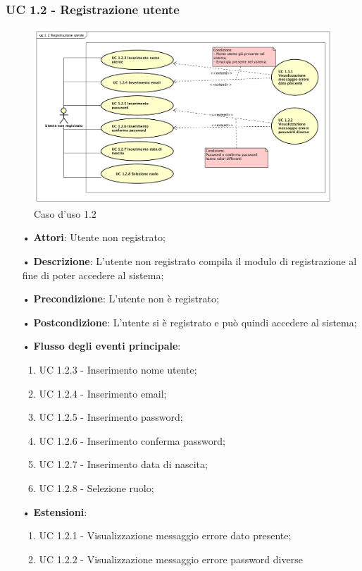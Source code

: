 \subsubsection{UC 1.2 - Registrazione utente}
\begin{figure}[H]
	\centering
	\includegraphics[width=17cm]{img/UC12.png} 
	\caption{Caso d'uso 1.2}\label{fig:12}
\end{figure}
\begin{itemize}
	\item[•]\textbf{Attori}: Utente non registrato;
	\item[•]\textbf{Descrizione}: L'utente non registrato compila il modulo di registrazione al fine di poter accedere al sistema;
	\item[•]\textbf{Precondizione}: L'utente non è registrato;
	\item[•]\textbf{Postcondizione}: L'utente si è registrato e può quindi accedere al sistema;
	\item[•]\textbf{Flusso degli eventi principale}:
	\begin{enumerate}
		\item UC 1.2.3 - Inserimento nome utente;
		\item UC 1.2.4 - Inserimento email;
		\item UC 1.2.5 - Inserimento password;
		\item UC 1.2.6 - Inserimento conferma password;
		\item UC 1.2.7 - Inserimento data di nascita;
		\item UC 1.2.8 - Selezione ruolo;
	\end{enumerate}
	\item[•]\textbf{Estensioni}:
	\begin{enumerate}
		\item UC 1.2.1 - Visualizzazione messaggio errore dato presente;
		\item UC 1.2.2 - Visualizzazione messaggio errore password diverse
	\end{enumerate}
\end{itemize}

